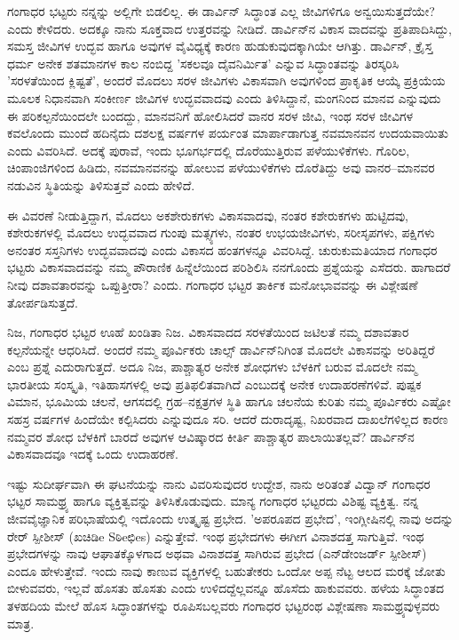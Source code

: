 {ಗಂಗಾಧರ ಭಟ್ಟರು ನನ್ನನ್ನು ಅಲ್ಲಿಗೇ ಬಿಡಲಿಲ್ಲ.  ಈ ಡಾರ್ವಿನ್ ಸಿದ್ಧಾಂತ ಎಲ್ಲ ಜೀವಿಗಳಿಗೂ ಅನ್ವಯಿಸುತ್ತದೆಯೇ? ಎಂದು ಕೇಳಿದರು.  ಅದಕ್ಕೂ ನಾನು ಸೂಕ್ತವಾದ ಉತ್ತರವನ್ನು ನೀಡಿದೆ.  ಡಾರ್ವಿನ್‍ನ ವಿಕಾಸ ವಾದವನ್ನು ಪ್ರತಿಪಾದಿಸಿದ್ದು, ಸಮಸ್ತ ಜೀವಿಗಳ ಉದ್ಭವ ಹಾಗೂ ಅವುಗಳ ವೈವಿಧ್ಯಕ್ಕೆ ಕಾರಣ ಹುಡುಕುವುದಕ್ಕಾಗಿಯೇ ಆಗಿತ್ತು.  ಡಾರ್ವಿನ್, ಕ್ರೈಸ್ತ ಧರ್ಮ ಅನೇಕ ಶತಮಾನಗಳ ಕಾಲ ನಂಬಿದ್ದ 'ಸಕಲವೂ ದೈವನಿರ್ಮಿತ' ಎನ್ನುವ ಸಿದ್ಧಾಂತವನ್ನು ತಿರಸ್ಕರಿಸಿ 'ಸರಳತೆಯಿಂದ ಕ್ಲಿಷ್ಟತೆ', ಅಂದರೆ ಮೊದಲು ಸರಳ ಜೀವಿಗಳು ವಿಕಾಸವಾಗಿ ಅವುಗಳಿಂದ ಪ್ರಾಕೃತಿಕ ಆಯ್ಕೆ ಪ್ರಕ್ರಿಯೆಯ ಮೂಲಕ ನಿಧಾನವಾಗಿ ಸಂಕೀರ್ಣ ಜೀವಿಗಳ ಉದ್ಭವವಾದವು ಎಂದು ತಿಳಿಸಿದ್ದಾನೆ, ಮಂಗನಿಂದ ಮಾನವ ಎನ್ನುವುದು ಈ ಪರಿಕಲ್ಪನೆಯಿಂದಲೇ ಬಂದದ್ದು, ಮಾನವನಿಗೆ ಹೋಲಿಸಿದರೆ ವಾನರ ಸರಳ ಜೀವಿ, ಇಂಥ ಸರಳ ಜೀವಿಗಳ ಕವಲೊಂದು ಮುಂದೆ ಹದಿನೈದು ದಶಲಕ್ಷ ವರ್ಷಗಳ ಪರ್ಯಂತ ಮಾರ್ಪಾಡಾಗುತ್ತ ನವಮಾನವನ ಉದಯವಾಯಿತು ಎಂದು ವಿವರಿಸಿದೆ.  ಅದಕ್ಕೆ ಪುರಾವೆ, ಇಂದು ಭೂಗರ್ಭದಲ್ಲಿ ದೊರೆಯುತ್ತಿರುವ ಪಳೆಯುಳಿಕೆಗಳು.  ಗೊರಿಲ, ಚಿಂಪಾಂಜಿಗಳಿಂದ ಹಿಡಿದು, ನವಮಾನವನನ್ನು ಹೋಲುವ ಪಳೆಯುಳಿಕೆಗಳು ದೊರೆತಿದ್ದು ಅವು ವಾನರ–ಮಾನವರ ನಡುವಿನ ಸ್ಥಿತಿಯನ್ನು ತಿಳಿಸುತ್ತವೆ ಎಂದು ಹೇಳಿದೆ.  

ಈ ವಿವರಣೆ ನೀಡುತ್ತಿದ್ದಾಗ, ಮೊದಲು ಅಕಶೇರುಕಗಳು ವಿಕಾಸವಾದವು, ನಂತರ ಕಶೇರುಕಗಳು ಹುಟ್ಟಿದವು, ಕಶೇರುಕಗಳಲ್ಲಿ ಮೊದಲು ಉದ್ಭವವಾದ ಗುಂಪು ಮತ್ಸ್ಯಗಳು, ನಂತರ ಉಭಯಜೀವಿಗಳು, ಸರೀಸೃಪಗಳು, ಪಕ್ಷಿಗಳು ಅನಂತರ ಸಸ್ತನಿಗಳು ಉದ್ಭವವಾದವು ಎಂದು ವಿಕಾಸದ ಹಂತಗಳನ್ನೂ ವಿವರಿಸಿದ್ದೆ.  ಚುರುಕುಮತಿಯಾದ ಗಂಗಾಧರ ಭಟ್ಟರು ವಿಕಾಸವಾದವನ್ನು ನಮ್ಮ ಪೌರಾಣಿಕ ಹಿನ್ನೆಲೆಯಿಂದ ಪರಿಶಿಲಿಸಿ ನನಗೊಂದು ಪ್ರಶ್ನೆಯನ್ನು ಎಸೆದರು.  ಹಾಗಾದರೆ ನೀವು ದಶಾವತಾರವನ್ನು ಒಪ್ಪುತ್ತೀರಾ? ಎಂದು.  ಗಂಗಾಧರ ಭಟ್ಟರ ತಾರ್ಕಿಕ ಮನೋಭಾವವನ್ನು ಈ ವಿಶ್ಲೇಷಣೆ ತೋರ್ಪಡಿಸುತ್ತದೆ. 

ನಿಜ, ಗಂಗಾಧರ ಭಟ್ಟರ ಊಹೆ ಖಂಡಿತಾ ನಿಜ.  ವಿಕಾಸವಾದದ ಸರಳತೆಯಿಂದ ಜಟಿಲತೆ ನಮ್ಮ ದಶಾವತಾರ ಕಲ್ಪನೆಯನ್ನೇ ಆಧರಿಸಿದೆ.  ಅಂದರೆ ನಮ್ಮ ಪೂರ್ವಿಕರು ಚಾಲ್ಸ್ ಡಾರ್ವಿನ್‍ನಿಗಿಂತ ಮೊದಲೇ ವಿಕಾಸವನ್ನು ಅರಿತಿದ್ದರೆ ಎಂಬ ಪ್ರಶ್ನೆ ಎದುರಾಗುತ್ತದೆ.  ಅದೂ ನಿಜ, ಪಾಶ್ಚಾತ್ಯರ ಅನೇಕ ಶೋಧಗಳು ಬೆಳಕಿಗೆ ಬರುವ ಮೊದಲೇ ನಮ್ಮ ಭಾರತೀಯ ಸಂಸ್ಕೃತಿ, ಇತಿಹಾಸಗಳಲ್ಲಿ ಅವು ಪ್ರತಿಫಲಿತವಾಗಿದೆ ಎಂಬುದಕ್ಕೆ ಅನೇಕ ಉದಾಹರಣೆಗಳಿವೆ.  ಪುಷ್ಪಕ ವಿಮಾನ, ಭೂಮಿಯ ಚಲನೆ, ಆಗಸದಲ್ಲಿ ಗ್ರಹ–ನಕ್ಷತ್ರಗಳ ಸ್ಥಿತಿ ಹಾಗೂ ಚಲನೆಯ ಕುರಿತು ನಮ್ಮ ಪೂರ್ವಿಕರು ಎಷ್ಟೋ ಸಹಸ್ರ ವರ್ಷಗಳ ಹಿಂದೆಯೇ ಕಲ್ಪಿಸಿದರು ಎನ್ನುವುದೂ ಸರಿ.  ಆದರೆ ದುರಾದೃಷ್ಟ, ನಿಖರವಾದ ದಾಖಲೆಗಳಿಲ್ಲದ ಕಾರಣ ನಮ್ಮವರ ಶೋಧ ಬೆಳಕಿಗೆ ಬಾರದೆ ಅವುಗಳ ಆವಿಷ್ಕಾರದ ಕೀರ್ತಿ ಪಾಶ್ಚಾತ್ಯರ ಪಾಲಾಯಿತಲ್ಲವೆ?  ಡಾರ್ವಿನ್‍ನ ವಿಕಾಸವಾದವೂ ಇದಕ್ಕೆ ಒಂದು ಉದಾಹರಣೆ.   

ಇಷ್ಟು ಸುದೀರ್ಘವಾಗಿ ಈ ಘಟನೆಯನ್ನು ನಾನು ವಿವರಿಸುವುದರ ಉದ್ದೇಶ, ನಾನು ಅರಿತಂತೆ ವಿದ್ವಾನ್ ಗಂಗಾಧರ ಭಟ್ಟರ ಸಾಮಥ್ರ್ಯ ಹಾಗೂ ವ್ಯಕ್ತಿತ್ವವನ್ನು ತಿಳಿಸಿಕೊಡುವುದು.  ಮಾನ್ಯ ಗಂಗಾಧರ ಭಟ್ಟರದು ವಿಶಿಷ್ಟ ವ್ಯಕ್ತಿತ್ವ.  ನನ್ನ ಜೀವವೈಜ್ಞಾನಿಕ ಪರಿಭಾಷೆಯಲ್ಲಿ ಇದೊಂದು ಉತ್ಕೃಷ್ಟ ಪ್ರಭೇದ.  'ಅಪರೂಪದ ಪ್ರಭೇದ', ಇಂಗ್ಲೀಷಿನಲ್ಲಿ ನಾವು ಅದನ್ನು ರೇರ್ ಸ್ಪೀಶೀಸ್ (ಖಚಿಡಿe Sಠಿeಛಿes) ಎನ್ನುತ್ತೇವೆ.  ಇಂಥ ಪ್ರಭೇದಗಳು ಈಗೀಗ ವಿನಾಶದತ್ತ ಸಾಗುತ್ತಿವೆ.  ಇಂಥ ಪ್ರಭೇದಗಳನ್ನು ನಾವು ಆಘಾತಕ್ಕೊಳಗಾದ ಅಥವಾ ವಿನಾಶದತ್ತ ಸಾಗಿರುವ ಪ್ರಭೇದ (ಎನ್‍ಡೇಂಜರ್ಡ್ ಸ್ಪೀಶೀಸ್) ಎಂದೂ ಹೇಳುತ್ತೇವೆ.  ಇಂದು ನಾವು ಕಾಣುವ ವ್ಯಕ್ತಿಗಳಲ್ಲಿ ಬಹುತೇಕರು ಒಂದೋ ಅಪ್ಪ ನೆಟ್ಟ ಆಲದ ಮರಕ್ಕೆ ಜೋತು ಬೀಳುವವರು, ಇಲ್ಲವೆ ಹೊಸತು ಹೊಸತು ಎಂದು ಉಳಿದದ್ದೆಲ್ಲವನ್ನೂ ಹೊಸೆದು ಹಾಕುವವರು.  ಹಳೆಯ ಸಿದ್ಧಾಂತದ ತಳಹದಿಯ ಮೇಲೆ ಹೊಸ ಸಿದ್ಧಾಂತಗಳನ್ನು ರೂಪಿಸಬಲ್ಲವರು ಗಂಗಾಧರ ಭಟ್ಟರಂಥ ವಿಶ್ಲೇಷಣಾ ಸಾಮಥ್ರ್ಯವುಳ್ಳವರು ಮಾತ್ರ.              

}
